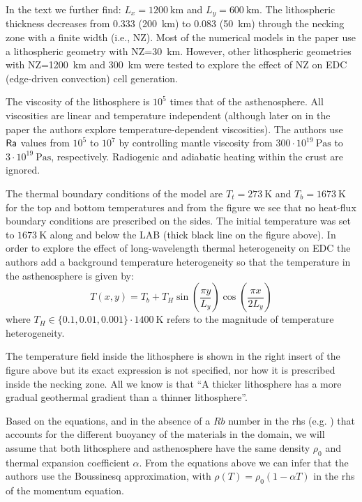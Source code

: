 In the text we further find: $L_x=1200~\si{\km}$ and $L_y=600~\si{\km}$.
The lithospheric thickness decreases from
0.333 (200~\si{\km}) to 0.083 (50~\si{\km}) through the necking zone with a finite
width (i.e., NZ).
Most of the numerical models in the paper use a lithospheric
geometry with NZ=30~\si{km}. However, other lithospheric geometries 
with NZ=1200~\si{\km} and 300~\si{\km} were tested to
explore the effect of NZ on EDC (edge-driven convection) cell generation.

The viscosity of the lithosphere is $10^5$ times that of the asthenosphere.
All viscosities are linear and temperature independent (although 
later on in the paper the authors explore temperature-dependent viscosities).
The authors use ${\mathsf{Ra}}$ values from $10^5$ to
$10^7$ by controlling mantle viscosity from $300\cdot 10^{19}~\si{\pascal\second}$ to
$3\cdot 10^{19}~\si{\pascal\second}$, respectively. Radiogenic and 
adiabatic heating within the crust are ignored.

The thermal boundary conditions of the model are $T_t=273~\si{\kelvin}$
and $T_b=1673~\si{\kelvin}$ for the top and bottom temperatures
and from the figure we see that no heat-flux boundary conditions are
prescribed on the sides.
The initial temperature was set to $1673~\si{\kelvin}$ along and below the LAB
(thick black line on the figure above).
In order to explore the effect of long-wavelength thermal heterogeneity 
on EDC the authors add a background temperature heterogeneity 
so that the temperature in the asthenosphere is given by:
\[
T(x,y)=T_b + T_H \sin\left(\frac{\pi y}{L_y}\right) \cos \left(\frac{\pi x}{2 L_y} \right)
\]
where $T_H\in \{0.1,0.01,0.001 \}\cdot 1400~\si{\kelvin}$ 
refers to the magnitude of temperature heterogeneity.

The temperature field inside the lithosphere is shown in the right 
insert of the figure above but its exact expression is not specified,
nor how it is prescribed inside the necking zone.
All we know is that ``A thicker lithosphere has a
more gradual geothermal gradient than a thinner lithosphere''.

Based on the equations, and in the absence of a $Rb$ number in the 
rhs (e.g. \cite{chsg14}) that accounts for the different buoyancy of the 
materials in the domain, we will assume that both lithosphere and 
asthenosphere have the same density $\rho_0$ and thermal expansion 
coefficient $\alpha$. From the equations above we can infer that the 
authors use the Boussinesq approximation, with $\rho(T)=\rho_0(1-\alpha T)$ 
in the rhs of the momentum equation.

